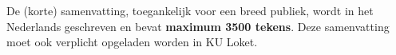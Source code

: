 De (korte) samenvatting, toegankelijk voor een breed publiek, wordt in het Nederlands geschreven en bevat {\bf maximum 3500 tekens}. Deze samenvatting moet ook verplicht opgeladen worden in KU Loket.

